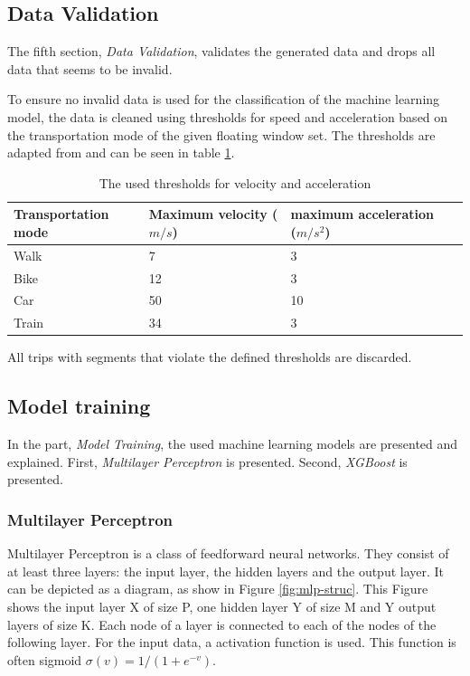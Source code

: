 \subsection{Data Validation}
The fifth section, \textit{Data Validation}, validates the generated data and drops all data that seems to be invalid.

To ensure no invalid data is used for the classification of the machine learning model, the data is cleaned using thresholds for speed and acceleration based on the transportation mode of the given floating window set. The thresholds are adapted from \cite{Dabiri2018} and can be seen in table \ref{table:thresholds}.
 
\begin{table}[h!]
    \centering
    \begin{tabular}{l l l l} 
     \hline
     Transportation mode & Maximum velocity ($m/s$) & maximum acceleration ($m/s^2$)\\
     \hline
     Walk & 7 & 3 \\
     Bike & 12 & 3 \\
     Car & 50 & 10 \\
     Train & 34 & 3 \\
     \hline
    \end{tabular}
    \caption{The used thresholds for velocity and acceleration \cite{Dabiri2018}}
    \label{table:thresholds}
\end{table}

All trips with segments that violate the defined thresholds are discarded.

\subsection{Model training}
In the part, \textit{Model Training}, the used machine learning models are presented and explained. First, \textit{Multilayer Perceptron} is presented. Second, \textit{XGBoost} is presented. 

\subsubsection{Multilayer Perceptron}
Multilayer Perceptron is a class of feedforward neural networks. They consist of at least three layers: the input layer, the hidden layers and the output layer. It can be depicted as a diagram, as show in Figure \ref{fig:mlp-struc}. This Figure shows the input layer X of size P, one hidden layer Y of size M and Y output layers of size K. Each node of a layer is connected to each of the nodes of the following layer. For the input data, a activation function is used. This function is often sigmoid $\sigma(v) = 1/(1+e^{-v})$. \cite{hastie2005elements}

